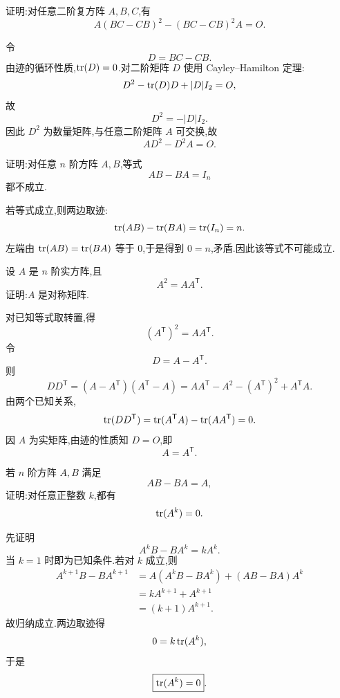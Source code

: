 \begin{example}
证明:对任意二阶复方阵 $A,B,C$,有
\[
A(BC-CB)^2-(BC-CB)^2A=O.
\]
\end{example}
\exampleblank

\begin{solution}
令
\[
D=BC-CB.
\]
由迹的循环性质,$\operatorname{tr}(D)=0$.对二阶矩阵 $D$ 使用 Cayley--Hamilton 定理:
\[
D^2-\operatorname{tr}(D)D+|D|I_2=O,
\]
故
\[
D^2=-|D|I_2.
\]
因此 $D^2$ 为数量矩阵,与任意二阶矩阵 $A$ 可交换,故
\[
AD^2-D^2A=O.
\]
\end{solution}

\begin{example}
证明:对任意 $n$ 阶方阵 $A,B$,等式
\[
AB-BA=I_n
\]
都不成立.
\end{example}
\exampleblank

\begin{solution}
若等式成立,则两边取迹:
\[
\operatorname{tr}(AB)-\operatorname{tr}(BA)=\operatorname{tr}(I_n)=n.
\]
左端由 $\operatorname{tr}(AB)=\operatorname{tr}(BA)$ 等于 $0$,于是得到 $0=n$,矛盾.因此该等式不可能成立.
\end{solution}

\begin{example}
设 $A$ 是 $n$ 阶实方阵,且
\[
A^2=AA^{\mathsf T}.
\]
证明:$A$ 是对称矩阵.
\end{example}
\exampleblank

\begin{solution}
对已知等式取转置,得
\[
(A^{\mathsf T})^2=AA^{\mathsf T}.
\]
令
\[
D=A-A^{\mathsf T}.
\]
则
\[
DD^{\mathsf T}
=(A-A^{\mathsf T})(A^{\mathsf T}-A)
=AA^{\mathsf T}-A^2-(A^{\mathsf T})^2+A^{\mathsf T}A.
\]
由两个已知关系,
\[
\operatorname{tr}(DD^{\mathsf T})
=\operatorname{tr}(A^{\mathsf T}A)-\operatorname{tr}(AA^{\mathsf T})=0.
\]
因 $A$ 为实矩阵,由迹的性质知 $D=O$,即
\[
\boxed{A=A^{\mathsf T}}.
\]
\end{solution}

\begin{example}
若 $n$ 阶方阵 $A,B$ 满足
\[
AB-BA=A,
\]
证明:对任意正整数 $k$,都有
\[
\operatorname{tr}(A^k)=0.
\]
\end{example}
\exampleblank

\begin{solution}
先证明
\[
A^kB-BA^k=kA^k.
\]
当 $k=1$ 时即为已知条件.若对 $k$ 成立,则
\[
\begin{aligned}
A^{k+1}B-BA^{k+1}
&=A(A^kB-BA^k)+(AB-BA)A^k\\
&=kA^{k+1}+A^{k+1}\\
&=(k+1)A^{k+1}.
\end{aligned}
\]
故归纳成立.两边取迹得
\[
0=k\operatorname{tr}(A^k),
\]
于是
\[
\boxed{\operatorname{tr}(A^k)=0}.
\]
\end{solution}


